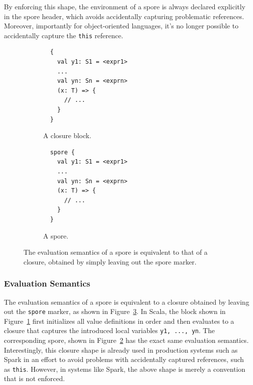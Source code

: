 \documentclass[runningheads]{llncs}
\begin{document}
\begin{sloppypar}
By enforcing this shape, the environment of a spore is always declared
explicitly in the spore header, which avoids accidentally capturing
problematic references. Moreover, importantly for object-oriented languages, it's no
longer possible to accidentally capture the \verb|this| reference.

\begin{figure}%
\begin{subfigure}{.5\textwidth}
  \centering
  \begin{lstlisting}
  {
    val y1: S1 = <expr1>
    ...
    val yn: Sn = <exprn>
    (x: T) => {
      // ...
    }
  }
  \end{lstlisting}
  \caption{A closure block.}
  \label{fig:normal-block}
\end{subfigure}%
\begin{subfigure}{.5\textwidth}
  \centering
  \begin{lstlisting}
  spore {
    val y1: S1 = <expr1>
    ...
    val yn: Sn = <exprn>
    (x: T) => {
      // ...
    }
  }
  \end{lstlisting}
  \caption{A spore.}
  \label{fig:normal-spore-shape}
\end{subfigure}%
\vspace{1mm}
\caption{The evaluation semantics of a spore is equivalent to that of a closure, obtained by simply leaving out the spore marker.}
\label{fig:evaluation-semantics}
\end{figure}

\subsubsection{Evaluation Semantics}

The evaluation semantics of a spore is equivalent to a closure
obtained by leaving out the \verb|spore| marker, as shown in
Figure~\ref{fig:evaluation-semantics}. In Scala, the block shown in
Figure~\ref{fig:normal-block} first initializes
all value definitions in order and then evaluates to a closure that captures
the introduced local variables \verb|y1, ..., yn|. The corresponding spore,
shown in Figure~\ref{fig:normal-spore-shape} has the exact same evaluation
semantics. Interestingly, this closure shape is already used in production
systems such as Spark in an effort to avoid problems with accidentally
captured references, such as \verb|this|. However, in systems like Spark, the
above shape is merely a convention that is not enforced.


\end{sloppypar}
\end{document}
